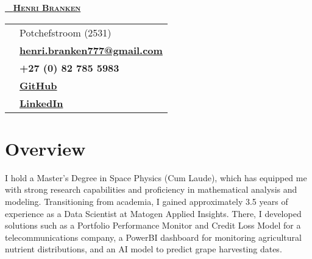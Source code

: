 \documentclass[a4paper,10pt]{article}
\begin{document}
\begin{center}
	{\Huge\textbf{\href{https://henribranken.github.io/MyCV/}{\faHandPointer~ \textsc{Henri Branken}}}}\\[0.5cm]
\end{center}
\begin{minipage}{0.7\textwidth}
	\begin{tcolorbox}[
		colback=gray!10, %
		colframe=teal,   %
		sharp corners=south, %
		boxrule=1pt, %
		width=0.8\textwidth,
		left=10pt, right=10pt, %
		]
		\begin{tabularx}{\textwidth}{c X}
			\faHome & Potchefstroom (2531) \\[0.2cm]
			\faEnvelope & \href{mailto:henri.branken777@gmail.com}{\textbf{henri.branken777@gmail.com}} \\[0.2cm]
			\faPhone & \textbf{+27 (0) 82 785 5983} \\[0.2cm]
			\faGithub & \href{https://github.com/HenriBranken}{\textbf{GitHub}} \\[0.2cm]
			\faLinkedin & \href{https://www.linkedin.com/in/henri-branken-1423a2153/}{\textbf{LinkedIn}}
		\end{tabularx}
	\end{tcolorbox}
\end{minipage}
\hfill
\begin{minipage}{0.3\textwidth}
\end{minipage}

\section*{Overview}
I hold a Master's Degree in Space Physics (Cum Laude), which has equipped me with strong research capabilities and proficiency in mathematical analysis and modeling. Transitioning from academia, I gained approximately 3.5 years of experience as a Data Scientist at Matogen Applied Insights. There, I developed solutions such as a Portfolio Performance Monitor and Credit Loss Model for a telecommunications company, a PowerBI dashboard for monitoring agricultural nutrient distributions, and an AI model to predict grape harvesting dates.
\end{document}
